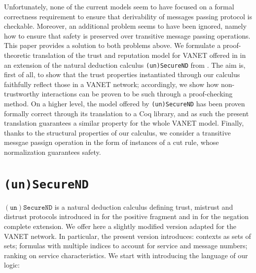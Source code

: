 \documentclass[compsoc, conference, letterpaper, 10pt, times]{IEEEtran}
\begin{document}
Unfortunately, none of the current models seem to have focused on a formal correctness requirement to ensure that derivability of messages passing protocol is checkable. Moreover, an additional problem seems to have been ignored, namely how to ensure that safety is preserved over transitive message passing operations. This paper provides a solution to both problems above. We formulate a proof-theoretic translation of the trust and reputation model for VANET offered in \cite{glenford} in an extension of the natural deduction calculus \texttt{(un)SecureND} from \cite{DBLP:conf/ifiptm/Primiero16}. The aim is, first of all, to show that the trust properties instantiated through our calculus faithfully reflect those in a VANET network; accordingly, we show how non-trustworthy interactions can be proven to be such through a proof-checking method. On a higher level, the model offered by \texttt{(un)SecureND} has been proven formally correct through its translation to a Coq library, and as such the present translation guarantees a similar property for the whole VANET model. Finally, thanks to the structural properties of our calculus, we consider a transitive messgae passign operation in the form of instances of a cut rule, whose normalization guarantees safety.




\section{\texttt{(un)SecureND}}\label{sec:logic}

$\mathtt{(un)SecureND}$ is a natural deduction calculus defining trust, mistrust and distrust protocols introduced in \cite{primiero_secureND} for the positive fragment  and in \cite{DBLP:conf/ifiptm/Primiero16} for the negation complete extension. We offer here a slightly modified version adapted for the VANET network. In particular, the present version introduces: contexts as sets of sets; formulas with multiple indices to account for service and message numbers; ranking on service characteristics. We start with introducing the language of our logic:
\end{document}
